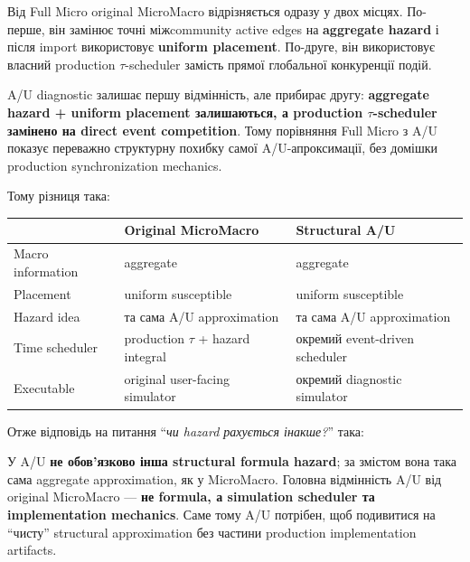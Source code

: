 \documentclass[11pt,a4paper]{article}
\begin{document}
\begin{tcolorbox}[colback=soft,colframe=boundary,title=Навіщо взагалі потрібен A/U diagnostic?]
Від Full Micro original MicroMacro відрізняється одразу у двох місцях. По-перше, він замінює точні міжcommunity active edges на \textbf{aggregate hazard} і після import використовує \textbf{uniform placement}. По-друге, він використовує власний production $\tau$-scheduler замість прямої глобальної конкуренції подій.

A/U diagnostic залишає першу відмінність, але прибирає другу: \textbf{aggregate hazard + uniform placement залишаються, а production $\tau$-scheduler замінено на direct event competition}. Тому порівняння Full Micro з A/U показує переважно структурну похибку самої A/U-апроксимації, без домішки production synchronization mechanics.
\end{tcolorbox}

Тому різниця така:

\begin{center}
\begin{tabular}{>{\raggedright\arraybackslash}p{42mm} >{\raggedright\arraybackslash}p{52mm} >{\raggedright\arraybackslash}p{52mm}}
\toprule
 & \textbf{Original MicroMacro} & \textbf{Structural A/U}\\
\midrule
Macro information & aggregate & aggregate\\
Placement & uniform susceptible & uniform susceptible\\
Hazard idea & та сама A/U approximation & та сама A/U approximation\\
Time scheduler & production $\tau$ + hazard integral & окремий event-driven scheduler\\
Executable & original user-facing simulator & окремий diagnostic simulator\\
\bottomrule
\end{tabular}
\end{center}

Отже відповідь на питання ``\textit{чи hazard рахується інакше?}'' така:

\begin{tcolorbox}[colback=soft,colframe=macro,title=Коротка відповідь]
У A/U \textbf{не обов'язково інша structural formula hazard}; за змістом вона така сама aggregate approximation, як у MicroMacro. Головна відмінність A/U від original MicroMacro --- \textbf{не formula, а simulation scheduler та implementation mechanics}. Саме тому A/U потрібен, щоб подивитися на ``чисту'' structural approximation без частини production implementation artifacts.
\end{tcolorbox}
\end{document}
